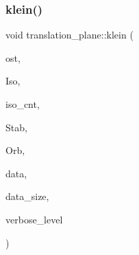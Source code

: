 \mbox{\label{classtranslation__plane_aa805dc12b74411034de155856d7c15f0}} 
\subsubsection{\texorpdfstring{klein()}{klein()}}
{\footnotesize\ttfamily void translation\+\_\+plane\+::klein (\begin{DoxyParamCaption}\item[{ofstream \&}]{ost,  }\item[{\mbox{\hyperlink{classisomorph}{isomorph}} $\ast$}]{Iso,  }\item[{\mbox{\hyperlink{galois_8h_a09fddde158a3a20bd2dcadb609de11dc}{I\+NT}}}]{iso\+\_\+cnt,  }\item[{\mbox{\hyperlink{classsims}{sims}} $\ast$}]{Stab,  }\item[{\mbox{\hyperlink{classschreier}{schreier}} \&}]{Orb,  }\item[{\mbox{\hyperlink{galois_8h_a09fddde158a3a20bd2dcadb609de11dc}{I\+NT}} $\ast$}]{data,  }\item[{\mbox{\hyperlink{galois_8h_a09fddde158a3a20bd2dcadb609de11dc}{I\+NT}}}]{data\+\_\+size,  }\item[{\mbox{\hyperlink{galois_8h_a09fddde158a3a20bd2dcadb609de11dc}{I\+NT}}}]{verbose\+\_\+level }\end{DoxyParamCaption})}

\mbox{\label{classtranslation__plane_a3babfb08bbb39c0b7174766db88d399f}} 
